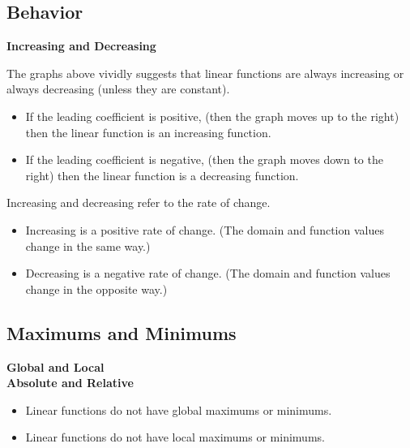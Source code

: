 \documentclass{ximera}
\begin{document}
\subsection*{Behavior}



\textbf{\textcolor{blue!55!black}{Increasing and Decreasing}}






The graphs above vividly suggests that linear functions are always increasing or always decreasing (unless they are constant).


\begin{itemize}
\item If the leading coefficient is positive, (then the graph moves up to the right) then the linear function is an increasing function.

\item If the leading coefficient is negative, (then the graph moves down to the right) then the linear function is a decreasing function.
\end{itemize}





Increasing and decreasing refer to the rate of change.


\begin{itemize}
\item Increasing is a positive rate of change. (The domain and function values change in the same way.)
\item Decreasing is a negative rate of change. (The domain and function values change in the opposite way.)
\end{itemize}
















\subsection*{Maximums and Minimums}

\textbf{\textcolor{blue!55!black}{Global and Local}} \\
\textbf{\textcolor{blue!55!black}{Absolute and Relative}} 


\begin{itemize}
     \item Linear functions do not have global maximums or minimums. 
     \item Linear functions do not have local maximums or minimums. 
\end{itemize}
\end{document}
